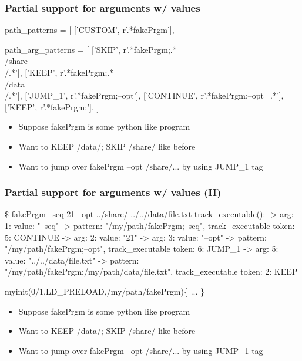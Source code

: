 \documentclass{beamer}
\begin{document}
\begin{frame}[fragile]
    \frametitle{Partial support for arguments w/ values}
 {\tiny
    \begin{semiverbatim}
path_patterns = [
    ['CUSTOM', r'.*\/fakePrgm'],

path_arg_patterns = [
  ['SKIP',     r'.*\/fakePrgm;.*\\/share\\/.*'],
  ['KEEP',     r'.*\/fakePrgm;.*\\/data\\/.*'],
  ['JUMP_1',   r'.*\/fakePrgm;--opt'],
  ['CONTINUE', r'.*\/fakePrgm;--opt=.*'],
  ['KEEP',     r'.*\/fakePrgm;'],
]
    \end{semiverbatim}
}
  \begin{itemize}
    \item Suppose fakePrgm is some python like program
    \item Want to KEEP /data/; SKIP /share/ like before
    \item Want to jump over fakePrgm --opt /share/... by using JUMP\_1 tag
  \end{itemize}
\end{frame}

\begin{frame}[fragile]
    \frametitle{Partial support for arguments w/ values (II)}
 {\tiny
    \begin{semiverbatim}
\$ fakePrgm --seq 21 --opt ../share/ ../../data/file.txt
    track_executable():
    -> arg: 1: value: "--seq"
    -> pattern: "/my/path/fakePrgm;--seq", track_executable token: 5: CONTINUE
    -> arg: 2: value: "21"
    -> arg: 3: value: "--opt"
    -> pattern: "/my/path/fakePrgm;--opt", track_executable token: 6: JUMP_1
    -> arg: 5: value: "../../data/file.txt"
    -> pattern: "/my/path/fakePrgm;/my/path/data/file.txt", track_executable token: 2: KEEP

myinit(0/1,LD_PRELOAD,/my/path/fakePrgm)\{
 ...
\}
    \end{semiverbatim}
}
  \begin{itemize}
    \item Suppose fakePrgm is some python like program
    \item Want to KEEP /data/; SKIP /share/ like before
    \item Want to jump over fakePrgm --opt /share/... by using JUMP\_1 tag
  \end{itemize}
\end{frame}
\end{document}
